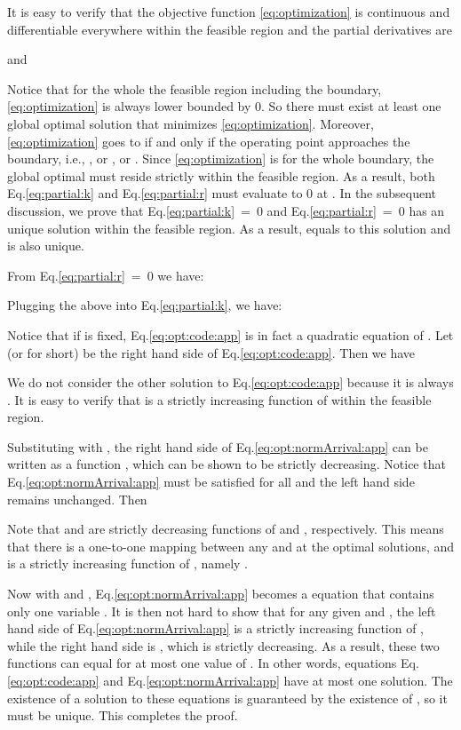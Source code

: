 \documentclass[journal]{IEEEtran}
\newcommand{\comment}[1]{}
\newcommand{\optSolution}{\xspace}
\begin{document}
\begin{IEEEproof}
\comment{
It is easy to verify that within the feasible region

}
It is easy to verify that the objective function \eqref{eq:optimization} is continuous and differentiable everywhere within the feasible region and the partial derivatives are 

and 


Notice that for the whole the feasible region including the boundary, \eqref{eq:optimization} is always lower bounded by 0. So there must exist at least one global optimal solution \optSolution that minimizes \eqref{eq:optimization}. Moreover, \eqref{eq:optimization} goes to  if and only if the operating point  approaches the boundary, i.e., , or , or . Since \eqref{eq:optimization} is  for the whole boundary, the global optimal \optSolution must reside strictly within the feasible region. As a result, both Eq.\ref{eq:partial:k} and Eq.\ref{eq:partial:r} must evaluate to 0 at \optSolution. 
In the subsequent discussion, we prove that Eq.\ref{eq:partial:k}~=~0 and Eq.\ref{eq:partial:r}~=~0 has an unique solution within the feasible region. As a result, \optSolution equals to this solution and is also unique.


From Eq.\ref{eq:partial:r}~=~0 we have:

Plugging the above into Eq.\ref{eq:partial:k}, we have:


Notice that if  is fixed, Eq.\ref{eq:opt:code:app} is in fact a quadratic equation of . 
Let  (or  for short) be the right hand side of Eq.\ref{eq:opt:code:app}. Then we have

We do not consider the other solution to Eq.\ref{eq:opt:code:app} because it is always .
It is easy to verify that  is a strictly increasing function of  within the feasible region. 


Substituting  with , the right hand side of Eq.\ref{eq:opt:normArrival:app} can be written as a function , which can be shown to be strictly decreasing. Notice that Eq.\ref{eq:opt:normArrival:app} must be satisfied for all  and the left hand side remains unchanged. Then

Note that  and  are strictly decreasing functions of  and , respectively. This means that there is a one-to-one mapping between any  and  at the optimal solutions, and  is a strictly increasing function of , namely . 

Now with  and , Eq.\ref{eq:opt:normArrival:app} becomes a equation that contains only one variable . It is then not hard to show that for any given  and , the left hand side of Eq.\ref{eq:opt:normArrival:app} is a strictly increasing function of , while the right hand side is , which is strictly decreasing. As a result, these two functions can equal for at most one value of . In other words, equations Eq.\ref{eq:opt:code:app} and Eq.\ref{eq:opt:normArrival:app} have at most one solution. The existence of a solution to these equations is guaranteed by the existence of \optSolution, so it must be unique. This completes the proof.
\end{IEEEproof}
\end{document}
